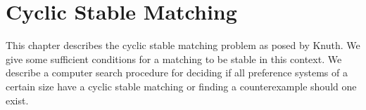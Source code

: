 \chapter{Cyclic Stable Matching}
This chapter describes the cyclic stable matching problem as posed by Knuth. We give some sufficient conditions for a matching to be stable in this context. We describe a computer search procedure for deciding if all preference systems of a certain size have a cyclic stable matching or finding a counterexample should one exist. 

